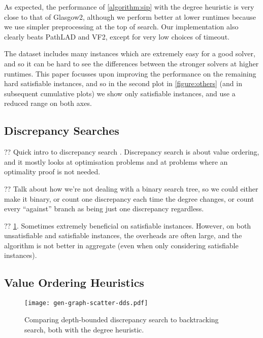 \documentclass{article}
\newcommand{\citep}[1]{\cite{#1}}
\begin{document}
As expected, the performance of \cref{algorithm:sip} with the degree heuristic is very close to that
of Glasgow2, although we perform better at lower runtimes because we use simpler preprocessing at
the top of search. Our implementation also clearly beats PathLAD and VF2, except for very low
choices of timeout.

The dataset includes many instances which are extremely easy for a good solver, and so it can be
hard to see the differences between the stronger solvers at higher runtimes. This paper focusses
upon improving the performance on the remaining hard satisfiable instances, and so in the second
plot in \cref{figure:others} (and in subsequent cumulative plots) we show only satisfiable
instances, and use a reduced range on both axes.

\subsection{Discrepancy Searches}

?? Quick intro to discrepancy search
\citep{DBLP:conf/ijcai/HarveyG95,DBLP:conf/aaai/Korf96,DBLP:conf/ijcai/Walsh97,DBLP:conf/cpaior/KarouiHLN07,DBLP:journals/jea/ProsserU11}.
Discrepancy search is about value ordering, and it mostly looks at optimisation problems and at
problems where an optimality proof is not needed.

?? Talk about how we're not dealing with a binary search tree, so we could either make it binary, or
count one discrepancy each time the degree changes, or count every ``against'' branch as being just
one discrepancy regardless.

?? \cref{figure:scatter-dds}. Sometimes extremely beneficial on satisfiable instances. However, on both
unsatisfiable and satisfiable instances, the overheads are often large, and the algorithm is not
better in aggregate (even when only considering satisfiable instances).

\subsection{Value Ordering Heuristics}

\begin{figure}[p]
    \centering
    \texttt{[image: gen-graph-scatter-dds.pdf]}

    \caption{Comparing depth-bounded discrepancy search to backtracking search, both with the degree
    heuristic.}\label{figure:scatter-dds}
\end{figure}
\end{document}
